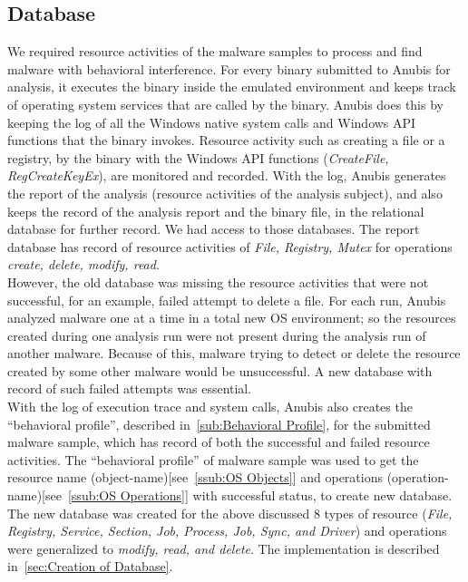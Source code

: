 \subsection{Database}
\label{sub:Database}
We required resource activities of the malware samples to process and find malware with behavioral interference.
For every binary submitted to Anubis for analysis, it executes the binary inside the emulated environment and keeps track of operating system services that are called by the binary.
Anubis does this by keeping the log of all the Windows native system calls and Windows API functions that the binary invokes.
Resource activity such as creating a file or a registry, by the binary with the Windows API functions (\emph{CreateFile, RegCreateKeyEx}), are monitored and recorded.
With the log, Anubis generates the report of the analysis (resource activities of the analysis subject), and also keeps the record of the analysis report and the binary file, in the relational database for further record.
We had access to those databases.
The report database has record of resource activities of \emph{File, Registry, Mutex} for operations \emph{create, delete, modify, read}.\\

However, the old database was missing the resource activities that were not successful, for an example, failed attempt to delete a file.
For each run, Anubis analyzed malware one at a time in a total new OS environment; so the resources created during one analysis run were not present during the analysis run of another malware.
Because of this, malware trying to detect or delete the resource created by some other malware would be unsuccessful.
A new database with record of such failed attempts was essential.\\

With the log of execution trace and system calls, Anubis also creates the ``behavioral profile'', described in~\autoref{sub:Behavioral Profile}, for the submitted malware sample, which has record of both the successful and failed resource activities.
The ``behavioral profile'' of malware sample was used to get the resource name (object-name)[see~\autoref{ssub:OS Objects}] and operations (operation-name)[see~\autoref{ssub:OS Operations}] with successful status, to create new database.
The new database was created for the above discussed 8 types of resource (\emph{File, Registry, Service, Section, Job, Process, Job, Sync, and Driver}) and operations were generalized to \emph{modify, read, and delete}.
The implementation is described in~\autoref{sec:Creation of Database}.


